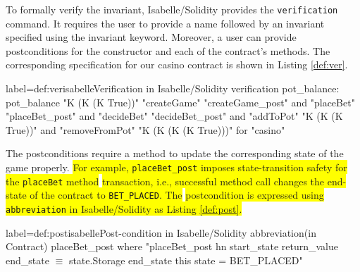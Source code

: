 \documentclass[a4paper,UKenglish,cleveref, autoref, thm-restate]{oasics-v2021}
\begin{document}
%
To formally verify the invariant, Isabelle/Solidity provides the \texttt{\color{isarblue}verification} command. 
%
It requires the user to provide a name followed by an invariant specified using the invariant keyword.
Moreover, a user can provide postconditions for the constructor and each of the contract's methods.
The corresponding specification for our casino contract is shown in Listing \ref{def:ver}.
\begin{code}{label={def:ver}}{isabelle}{Verification in Isabelle/Solidity
  \hfill{}%
}
verification pot_balance:
   pot_balance
  "K (K (K True))"
  "createGame" "createGame_post" and
  "placeBet" "placeBet_post" and
  "decideBet" "decideBet_post" and
  "addToPot" "K (K (K True))" and
  "removeFromPot" "K (K (K (K True)))"
  for "casino"
\end{code}
%
The postconditions require a method to update the corresponding state of the game properly.
%
\colorbox{yellow}{
For example, \texttt{placeBet\_{post}} imposes state-transition safety for the \texttt{placeBet} method} \colorbox{yellow}{ transaction, i.e., successful method call changes the end-state of the contract to 	\texttt{BET\_PLACED}. 
%
The} \colorbox{yellow}{ postcondition is expressed using \texttt{\color{isarblue}abbreviation} in Isabelle/Solidity as Listing \ref{def:post}.}
%
\begin{code}{label={def:post}}{isabelle}{Post-condition in Isabelle/Solidity
  \hfill{}%
}
abbreviation(in Contract) placeBet_post where
"placeBet_post hn start_state return_value end_state $\equiv$
  state.Storage end_state this state = BET_PLACED"
\end{code}
\end{document}
